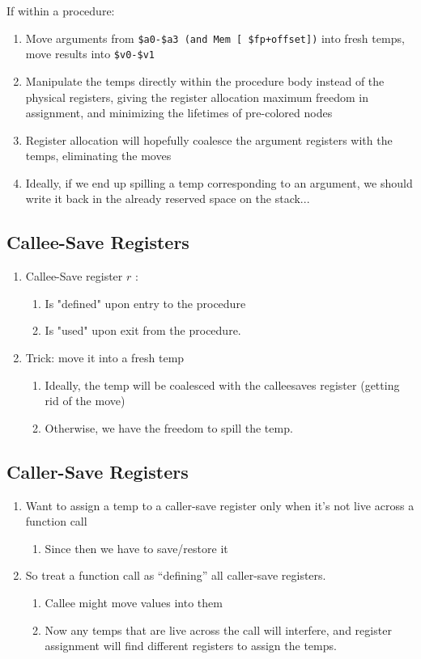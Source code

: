 \documentclass[a4paper]{exam}
\theoremstyle{definition}
\begin{document}
If within a procedure:
\begin{enumerate}
    \item Move arguments from \texttt{\$a0-\$a3 (and Mem [ \$fp+offset])} into fresh temps, move results into \texttt{\$v0-\$v1}
    \item Manipulate the temps directly within the procedure body instead of the physical registers, giving the register allocation maximum freedom in assignment, and minimizing the lifetimes of pre-colored nodes
    \item  Register allocation will hopefully coalesce the argument registers with the temps, eliminating the moves
    \item Ideally, if we end up spilling a temp corresponding to an argument, we should write it back in the already reserved space on the stack...
\end{enumerate}

\subsection{Callee-Save Registers}
\begin{enumerate}
    \item Callee-Save register $r$ :
    \begin{enumerate}
        \item Is "defined" upon entry to the procedure
\item Is "used" upon exit from the procedure.
    \end{enumerate}
\item Trick: move it into a fresh temp
\begin{enumerate}
    \item Ideally, the temp will be coalesced with the calleesaves register (getting rid of the move)
    \item Otherwise, we have the freedom to spill the temp.
\end{enumerate}
\end{enumerate}
\subsection{Caller-Save Registers}
\begin{enumerate}
    \item Want to assign a temp to a caller-save register only when it’s not live across a function call  
    \begin{enumerate}
        \item   Since then we have to save/restore it 
    
    \end{enumerate}
       \item So treat a function call as “defining” all caller-save registers.
\begin{enumerate}
    \item Callee might move values into them 
    \item Now any temps that are live across the call will interfere, and register assignment will find different registers to assign the temps.
\end{enumerate}

\end{enumerate}
\end{document}
